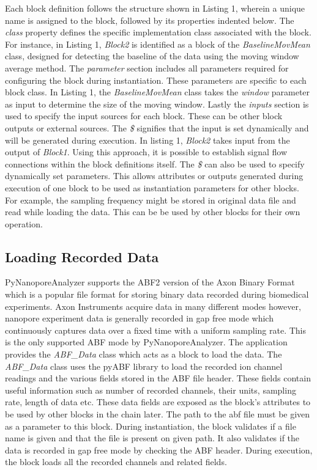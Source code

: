 \documentclass[journal]{IEEEtran}
\begin{document}


Each block definition follows the structure shown in Listing 1, wherein a unique name is assigned to the block, followed by its properties indented below. The \textit{class} property defines the specific implementation class associated with the block. For instance, in Listing 1, \textit{Block2} is identified as a block of the \textit{BaselineMovMean} class, designed for detecting the baseline of the data using the moving window average method. The \textit{parameter} section includes all parameters required for configuring the block during instantiation. These parameters are specific to each block class. In Listing 1, the \textit{BaselineMovMean} class takes the \textit{window} parameter as input to determine the size of the moving window.  Lastly the \textit{inputs} section is used to specify the input sources for each block. These can be other block outputs or external sources. The \textit{\$} signifies that the input is set dynamically and will be generated during execution. In listing 1, \textit{Block2} takes input from the output of \textit{Block1}. Using this approach, it is possible to establish signal flow connections within the block definitions itself. The \textit{\$} can also be used to specify dynamically set parameters. This allows attributes or outputs generated during execution of one block to be used as instantiation parameters for other blocks. For example, the sampling frequency might be stored in original data file and read while loading the data. This can be be used by other blocks for their own operation.

\subsection{Loading Recorded Data}
PyNanoporeAnalyzer supports the ABF2 version of the Axon Binary Format which is a popular file format for storing binary data recorded during biomedical experiments. Axon Instruments acquire data in many different modes however, nanopore experiment data is generally recorded in gap free mode which continuously captures data over a fixed time with a uniform sampling rate. This is the only supported ABF mode by PyNanoporeAnalyzer. The application provides the \textit{ABF\_Data} class which acts as a block to load the data. The \textit{ABF\_Data} class uses the pyABF library \cite{hardenPyABF2022} to load the recorded ion channel readings and the various fields stored in the ABF file header. These fields contain useful information such as number of recorded channels, their units, sampling rate, length of data etc. These data fields are exposed as the block's attributes to be used by other blocks in the chain later. The path to the abf file must be given as a parameter to this block. During instantiation, the block validates if a file name is given and that the file is present on given path. It also validates if the data is recorded in gap free mode by checking the ABF header. During execution, the block loads all the recorded channels and related fields.
\end{document}
